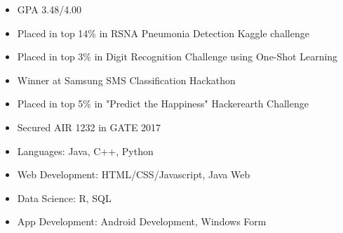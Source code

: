 \documentclass[10pt,letterpaper,ragged2e]{altacv}
\begin{document}
\begin{itemize}
  \item GPA 3.48/4.00
\end{itemize}
\divider


\smallskip
\begin{itemize}
\item Placed in top 14\% in RSNA Pneumonia Detection Kaggle challenge
\smallskip
\item Placed in top 3\% in Digit Recognition Challenge using One-Shot Learning
\smallskip
\item Winner at Samsung SMS Classification Hackathon
\smallskip
\item Placed in top 5\% in "Predict the Happiness" Hackerearth Challenge
\smallskip
\item Secured AIR 1232 in GATE 2017
\end{itemize}

\begin{itemize}
    \item Languages: Java, C++, Python
    \smallskip
    \item Web Development: HTML/CSS/Javascript, Java Web
    \smallskip
    \item Data Science: R, SQL
    \smallskip
    \item App Development: Android Development, Windows Form
\end{itemize}



{}


\end{document}
